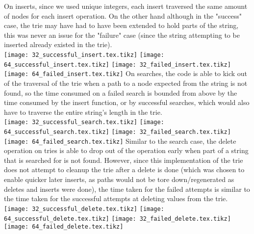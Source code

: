 \documentclass{llncs}
\begin{document}
\newpage
On inserts, since we used unique integers, each insert traversed the same amount of nodes for each insert operation. On the other hand although in the "success" case, the trie may have had to have been extended to hold parts of the string, this was never an issue for the "failure" case (since the string attempting to be inserted already existed in the trie).\\
\texttt{[image: 32\_successful\_insert.tex.tikz]}
\texttt{[image: 64\_successful\_insert.tex.tikz]}
\texttt{[image: 32\_failed\_insert.tex.tikz]}
\texttt{[image: 64\_failed\_insert.tex.tikz]}
\newpage
On searches, the code is able to kick out of the traversal of the trie when a path to a node expected from the string is not found, so the time consumed on a failed search is bounded from above by the time consumed by the insert function, or by successful searches, which would also have to traverse the entire string's length in the trie. \\
\texttt{[image: 32\_successful\_search.tex.tikz]}
\texttt{[image: 64\_successful\_search.tex.tikz]}
\texttt{[image: 32\_failed\_search.tex.tikz]}
\texttt{[image: 64\_failed\_search.tex.tikz]}
\newpage
Similar to the search case, the delete operation on tries is able to drop out of the operation early when part of a string that is searched for is not found. However, since this implementation of the trie does not attempt to cleanup the trie after a delete is done (which was chosen to enable quicker later inserts, as paths would not be tore down/regenerated as deletes and inserts were done), the time taken for the failed attempts is similar to the time taken for the successful attempts at deleting values from the trie. \\
\texttt{[image: 32\_successful\_delete.tex.tikz]}
\texttt{[image: 64\_successful\_delete.tex.tikz]}
\texttt{[image: 32\_failed\_delete.tex.tikz]}
\texttt{[image: 64\_failed\_delete.tex.tikz]}

\newpage
\end{document}
